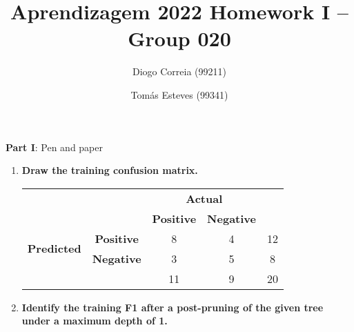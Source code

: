 \documentclass[12pt]{article}
\title{\large{Aprendizagem 2022}\vskip 0.2cm Homework I -- Group 020}
\date{}
\author{Diogo Correia (99211) \and Tomás Esteves (99341)}
\begin{document}
\maketitle
\center\large{\vskip -1.0cm\textbf{Part I}: Pen and paper}
\begin{enumerate}[leftmargin=\labelsep]
    Given the following decision tree learnt from 20 observation using Shannon entropy, with leaf annotations (\texttt{\#correct/\#total}).

    \begin{figure}[h!]
        \centering
        
        \caption{Decision Tree from Part I}
        \label{fig:decision-tree}
    \end{figure}

    \item \textbf{Draw the training confusion matrix.}\\
          \vspace{0.5em}
          \begin{center}

              \begin{tabular}{|c|c|c|c|c|}
                  \cline{3-4}
                  \multicolumn{2}{c}{}                & \multicolumn{2}{|c|}{\textbf{Actual}} & \multicolumn{1}{c}{}                             \\
                  \cline{3-4}
                  \multicolumn{2}{c|}{}               & \textbf{Positive}                     & \textbf{Negative}    & \multicolumn{1}{c}{}      \\
                  \hline
                  \multirow{2}{*}{\textbf{Predicted}} & \textbf{Positive}                     & 8                    & 4                    & 12 \\
                  \cline{2-5}
                                                      & \textbf{Negative}                     & 3                    & 5                    & 8  \\
                  \hline
                  \multicolumn{2}{c|}{}               & 11                                    & 9                    & 20                        \\
                  \cline{3-5}
              \end{tabular}
          \end{center}

    \item \textbf{Identify the training F1 after a post-pruning of the given tree under a maximum depth of 1.}


\end{enumerate}
\end{document}
